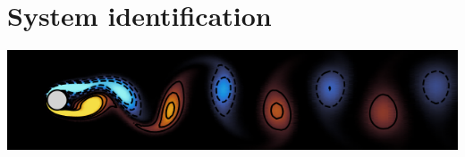 \documentclass[aspectratio=169, usenames, dvipsnames]{beamer}
\begin{document}
%
%
%
%
%
%
%
%
%
%
\section{System identification}
\begin{frame}
  \sectionpage
\end{frame}

\begin{frame}
  \centering
  \vfill
  \includegraphics[width=\textwidth]{dns_snapshot}
  \vfill
\end{frame}
\end{document}
